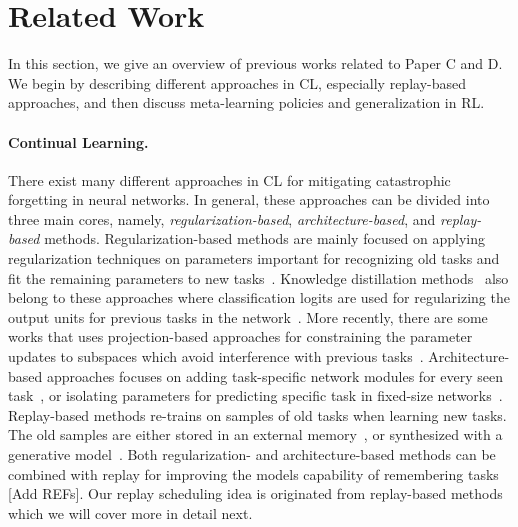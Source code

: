 \section{Related Work}\label{ch4/sec:related_work}

In this section, we give an overview of previous works related to Paper C and D. We begin by describing different approaches in CL, especially replay-based approaches, and then discuss meta-learning policies and generalization in RL.

\paragraph{Continual Learning.} There exist many different approaches in CL for mitigating catastrophic forgetting in neural networks. In general, these approaches can be divided into three main cores, namely, \textit{regularization-based}, \textit{architecture-based}, and \textit{replay-based} methods. Regularization-based methods are mainly focused on applying regularization techniques on parameters important for recognizing old tasks and fit the remaining parameters to new tasks~\cite{kirkpatrick2017overcoming, zenke2017continual, nguyen2017variational}. Knowledge distillation methods~\cite{hinton2015distilling} also belong to these approaches where classification logits are used for regularizing the output units for previous tasks in the network~\cite{li2017learning, schwarz2018progress}. More recently, there are some works that uses projection-based approaches for constraining the parameter updates to subspaces which avoid interference with previous tasks~\cite{saha2021gradient, kao2021natural}. Architecture-based approaches focuses on adding task-specific network modules for every seen task~\cite{rusu2016progressive, yoon2017lifelong, yoon2019scalable, ebrahimi2020adversarial}, or isolating parameters for predicting specific task in fixed-size networks~\cite{mallya2018packnet, serra2018overcoming, schwarz2021powerpropagation}. Replay-based methods re-trains on samples of old tasks when learning new tasks. The old samples are either stored in an external memory~\cite{chaudhry2019tiny, hayes2020remind, rolnick2018experience}, or synthesized with a generative model~\cite{shi2019variational, van2018generative, van2020brain, wu2018memory}. Both regularization- and architecture-based methods can be combined with replay for improving the models capability of remembering tasks [Add REFs]. Our replay scheduling idea is originated from replay-based methods which we will cover more in detail next. 


